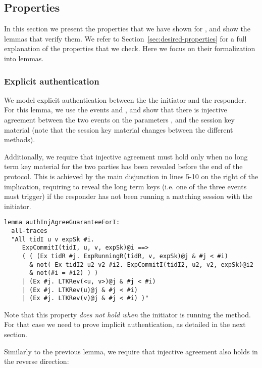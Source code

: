 \subsection{Properties}
\label{sec:properties}

In this section we present the properties that we have shown for \mEdhoc, and
show the lemmas that verify them. We refer to
Section~\ref{sec:desired-properties} for a full explanation of the properties
that we check. Here we focus on their formalization into \mTamarin{} lemmas.

\subsubsection{Explicit authentication}

We model explicit authentication between the the initiator and the
responder.
%
For this lemma, we use the events  and
, and show that there is injective agreement
between the two events on the parameters ,
 and the session key material  (note
that the session key material changes between the different \mEdhoc{}
methods).

Additionally, we require that injective agreement must hold only when
no long term key material for the two parties has been revealed before
the end of the protocol.
%
This is achieved by the main disjunction in lines 5-10 on the right of
the implication, requiring to reveal the long term keys (i.e. one of
the three  events must trigger) if the responder has
not been running a matching session with the initiator.

\begin{lstlisting}
lemma authInjAgreeGuaranteeForI:
  all-traces
  "All tidI u v expSk #i.
     ExpCommitI(tidI, u, v, expSk)@i ==>
     ( ( (Ex tidR #j. ExpRunningR(tidR, v, expSk)@j & #j < #i)
       & not( Ex tidI2 u2 v2 #i2. ExpCommitI(tidI2, u2, v2, expSk)@i2
       & not(#i = #i2) ) )
     | (Ex #j. LTKRev(<u, v>)@j & #j < #i)
     | (Ex #j. LTKRev(u)@j & #j < #i)
     | (Ex #j. LTKRev(v)@j & #j < #i) )"
\end{lstlisting}

Note that this property \emph{does not hold when} the initiator is
running the \mStat{} method.
%
For that case we need to prove implicit authentication, as detailed in
the next section.

Similarly to the previous lemma, we require that injective agreement also holds
in the reverse direction:

